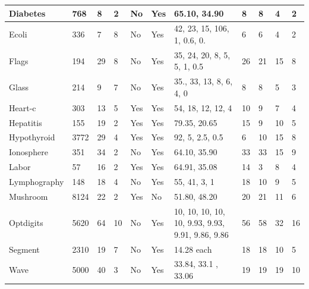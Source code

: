 \documentclass[review]{elsarticle}
\begin{document}
\begin{table}[p]
\begin{tabular}{|p{1.5cm}|p{0.5cm}|p{0.5cm}|p{0.5cm}|p{0.5cm}|p{0.5cm}|p{3cm}|p{0.5cm}|p{0.5cm}|p{1cm}|p{1cm}|}
\hline Diabetes & 768 & 8 & 2 & No & Yes & 65.10, 34.90 & 8 & 8 & 4 & 2 \\
\hline Ecoli & 336 & 7 & 8 & No & Yes & 42,  23, 15, 106, 1,  0.6, 0. & 6 & 6 & 4 & 2 \\ 
\hline Flags & 194 & 29 & 8 & No & Yes & 35, 24, 20, 8, 5, 5,  1, 0.5 & 26 & 21 & 15 & 8 \\ 
\hline Glass & 214 & 9 & 7 & No & Yes & 35., 33, 13, 8, 6, 4, 0 & 8 & 8 & 5 & 3 \\ 
\hline Heart-c & 303 & 13 & 5 & Yes & Yes & 54, 18, 12, 12, 4 & 10 & 9 & 7 & 4 \\ 
\hline Hepatitis & 155 & 19 & 2 & Yes & Yes & 79.35, 20.65 & 15 & 9 & 10 & 5 \\ 
\hline Hypothyroid & 3772 & 29 & 4 & Yes & Yes & 92, 5, 2.5, 0.5 & 6 & 10 & 15 & 8 \\ 
\hline Ionosphere & 351 & 34 & 2 & No & Yes & 64.10, 35.90 & 33 & 33 & 15 & 9 \\ 
\hline Labor & 57 & 16 & 2 & Yes & Yes & 64.91, 35.08 & 14 & 3 & 8 & 4 \\ 
\hline Lymphography & 148 & 18 & 4 & No & Yes & 55, 41, 3, 1 & 18 & 10 & 9 & 5 \\ 
\hline Mushroom & 8124 & 22 & 2 & Yes & No & 51.80, 48.20 & 20 & 21 & 11 & 6 \\ 
\hline Optdigits & 5620 & 64 & 10 & No & Yes & 10, 10, 10, 10, 10,  9.93, 9.93, 9.91, 9.86, 9.86 & 56 & 58 & 32 & 16 \\ 
\hline Segment & 2310 & 19 & 7 & No & Yes & 14.28 each & 18 & 18 & 10 & 5 \\ 
\hline Wave & 5000 & 40 & 3 & No & Yes & 33.84, 33.1 , 33.06 & 19 & 19 & 19 & 10 \\ 
	\hline 
\end{tabular} 
\end{table}
\end{document}
